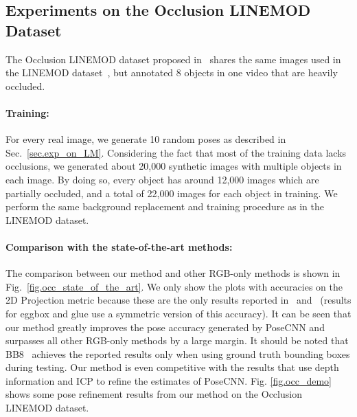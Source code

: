 \documentclass[twocolumn]{svjour3}
\begin{document}

\subsection{Experiments on the Occlusion LINEMOD Dataset}
\label{sec.exps_on_occ}
The Occlusion LINEMOD dataset proposed in~\citep{brachmann2016uncertainty} shares the same images used in the LINEMOD dataset~\citep{hinterstoisser2012accv}, but annotated 8 objects in one video that are heavily occluded.

\paragraph{Training:} For every real image, we generate 10 random poses as described in Sec.~\ref{sec.exp_on_LM}. Considering the fact that most of the training data lacks occlusions, we generated about 20,000 synthetic images with multiple objects in each image. By doing so, every object has around 12,000 images which are partially occluded, and a total of 22,000 images for each object in training. We perform the same background replacement and training procedure as in the LINEMOD dataset. 


\paragraph{Comparison with the state-of-the-art methods:} The comparison between our method and other RGB-only methods is shown in Fig.~\ref{fig.occ_state_of_the_art}. We only show the plots with accuracies on the 2D Projection metric because these are the only results reported in~\citep{rad2017bb8} and~\citep{tekin2017real} (results for eggbox and glue use a symmetric version of this accuracy). It can be seen that our method greatly improves the pose accuracy generated by PoseCNN and surpasses all other RGB-only methods by a large margin. It should be noted that BB8~\citep{rad2017bb8}  achieves the reported results only when using ground truth bounding boxes during testing. Our method is even competitive with the results that use depth information and ICP to refine the estimates of PoseCNN. Fig. \ref{fig.occ_demo} shows some pose refinement results from our method on the Occlusion LINEMOD dataset.
\end{document}
